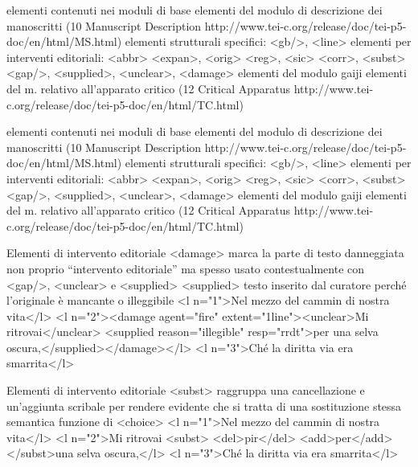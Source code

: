 elementi contenuti nei moduli di base
elementi del modulo di descrizione dei manoscritti (10 Manuscript
Description http://www.tei-c.org/release/doc/tei-p5-doc/en/html/MS.html) elementi strutturali specifici:
<gb/>, <line>
elementi per interventi editoriali:
<abbr> <expan>, <orig> <reg>, <sic> <corr>, <subst>
<gap/>, <supplied>, <unclear>, <damage>
elementi del modulo gaiji
elementi del m. relativo all’apparato critico (12 Critical Apparatus
http://www.tei-c.org/release/doc/tei-p5-doc/en/html/TC.html)

elementi contenuti nei moduli di base
elementi del modulo di descrizione dei manoscritti (10 Manuscript
Description http://www.tei-c.org/release/doc/tei-p5-doc/en/html/MS.html) elementi strutturali specifici:
<gb/>, <line>
elementi per interventi editoriali:
<abbr> <expan>, <orig> <reg>, <sic> <corr>, <subst>
<gap/>, <supplied>, <unclear>, <damage>
elementi del modulo gaiji
elementi del m. relativo all’apparato critico (12 Critical Apparatus
http://www.tei-c.org/release/doc/tei-p5-doc/en/html/TC.html)

Elementi di intervento editoriale <damage> marca la parte di testo danneggiata
non proprio “intervento editoriale” ma spesso usato contestualmente con <gap/>, <unclear> e <supplied>
<supplied> testo inserito dal curatore perché l’originale è mancante o illeggibile
<l n="1">Nel mezzo del cammin di nostra vita</l> <l n="2"><damage agent="fire" extent="1line"><unclear>Mi ritrovai</unclear> <supplied reason="illegible" resp="rrdt">per una selva oscura,</supplied></damage></l>
<l n="3">Ché la diritta via era smarrita</l>

Elementi di intervento editoriale
<subst> raggruppa una cancellazione e un’aggiunta scribale per rendere evidente che si tratta di una sostituzione
stessa semantica funzione di <choice>
<l n="1">Nel mezzo del cammin di nostra vita</l> <l n="2">Mi ritrovai <subst>
<del>pir</del>
<add>per</add>
</subst>una selva oscura,</l>
<l n="3">Ché la diritta via era smarrita</l>